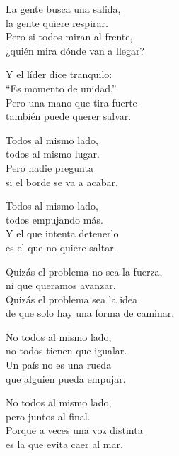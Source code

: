 \begin{lyrics}
La gente busca una salida,\\
la gente quiere respirar.\\
Pero si todos miran al frente,\\
¿quién mira dónde van a llegar?

Y el líder dice tranquilo:\\
“Es momento de unidad.”\\
Pero una mano que tira fuerte\\
también puede querer salvar.

Todos al mismo lado,\\
todos al mismo lugar.\\
Pero nadie pregunta\\
si el borde se va a acabar.

Todos al mismo lado,\\
todos empujando más.\\
Y el que intenta detenerlo\\
es el que no quiere saltar.

Quizás el problema no sea la fuerza,\\
ni que queramos avanzar.\\
Quizás el problema sea la idea\\
de que solo hay una forma de caminar.

No todos al mismo lado,\\
no todos tienen que igualar.\\
Un país no es una rueda\\
que alguien pueda empujar.

No todos al mismo lado,\\
pero juntos al final.\\
Porque a veces una voz distinta\\
es la que evita caer al mar.
\end{lyrics}

